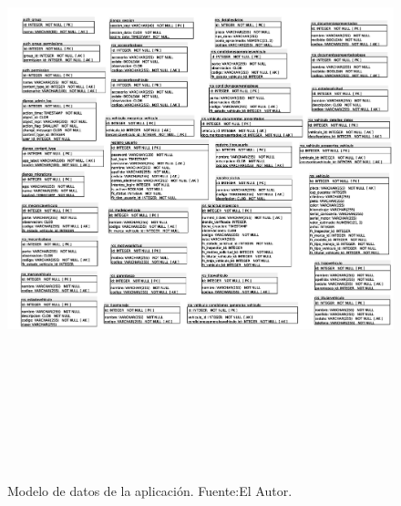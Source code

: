 \begin{figure}[H]
\begin{center}
	\includegraphics[width=\textwidth, height=18cm]{img/modelado/modelo_4.jpg}
\end{center}
\caption{Modelo de datos de la aplicación. Fuente:El Autor.}
\label{fig:modelo_datos_de_la_aplicacion}
\end{figure}

\newpage


